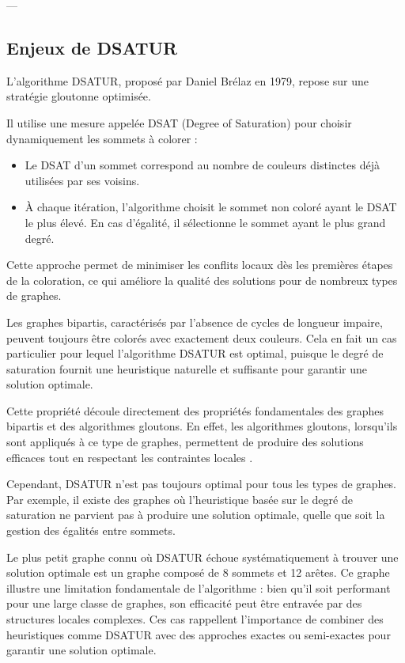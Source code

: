\documentclass[11pt]{article}
\begin{document}
---

\subsection{Enjeux de DSATUR}

L’algorithme DSATUR, proposé par Daniel Brélaz en 1979, repose sur une stratégie gloutonne optimisée.

Il utilise une mesure appelée DSAT (Degree of Saturation) pour choisir dynamiquement les sommets à colorer :
\begin{itemize}
    \item Le DSAT d’un sommet correspond au nombre de couleurs distinctes déjà utilisées par ses voisins.
    \item À chaque itération, l’algorithme choisit le sommet non coloré ayant le DSAT le plus élevé. En cas d’égalité, il sélectionne le sommet ayant le plus grand degré.
\end{itemize}

Cette approche permet de minimiser les conflits locaux dès les premières étapes de la coloration, ce qui améliore la qualité des solutions pour de nombreux types de graphes.\newline

Les graphes bipartis, caractérisés par l'absence de cycles de longueur impaire, peuvent toujours être colorés avec exactement deux couleurs. Cela en fait un cas particulier pour lequel l'algorithme DSATUR est optimal, puisque le degré de saturation fournit une heuristique naturelle et suffisante pour garantir une solution optimale. \newline

Cette propriété découle directement des propriétés fondamentales des graphes bipartis et des algorithmes gloutons. En effet, les algorithmes gloutons, lorsqu'ils sont appliqués à ce type de graphes, permettent de produire des solutions efficaces tout en respectant les contraintes locales \cite{greedy_algorithms}.\newline

Cependant, DSATUR n'est pas toujours optimal pour tous les types de graphes. Par exemple, il existe des graphes où l'heuristique basée sur le degré de saturation ne parvient pas à produire une solution optimale, quelle que soit la gestion des égalités entre sommets.

Le plus petit graphe connu où DSATUR échoue systématiquement à trouver une solution optimale est un graphe composé de 8 sommets et 12 arêtes. Ce graphe illustre une limitation fondamentale de l'algorithme : bien qu'il soit performant pour une large classe de graphes, son efficacité peut être entravée par des structures locales complexes. Ces cas rappellent l'importance de combiner des heuristiques comme DSATUR avec des approches exactes ou semi-exactes pour garantir une solution optimale.
\end{document}
